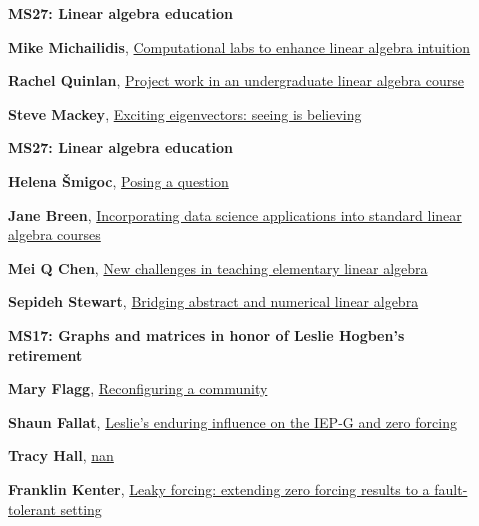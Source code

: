 \documentclass[ILAS2025-program.tex]{subfiles}
\begin{document}
        \begin{description}
    \item[] {\color{mstitle}\textbf{MS27: Linear algebra education}} 
    \item[] \hypertarget{up0292}{}\textbf{Mike Michailidis}, \hyperlink{down0292}{Computational labs to enhance linear algebra intuition}
        \item[] \hypertarget{up0293}{}\textbf{Rachel Quinlan}, \hyperlink{down0293}{Project work in an undergraduate linear algebra course}
        \item[] \hypertarget{up0294}{}\textbf{Steve Mackey}, \hyperlink{down0294}{Exciting eigenvectors: seeing is believing}
        \end{description}
    \begin{description}
    \item[] {\color{mstitle}\textbf{MS27: Linear algebra education}} 
    \item[] \hypertarget{up0331}{}\textbf{Helena Šmigoc}, \hyperlink{down0331}{Posing a question}
        \item[] \hypertarget{up0332}{}\textbf{Jane Breen}, \hyperlink{down0332}{Incorporating data science applications into standard linear algebra courses
}
        \item[] \hypertarget{up0333}{}\textbf{Mei Q Chen}, \hyperlink{down0333}{New challenges in teaching elementary linear algebra}
        \item[] \hypertarget{up0334}{}\textbf{Sepideh Stewart}, \hyperlink{down0334}{Bridging abstract and numerical linear algebra}
        \end{description}
    \begin{description}
    \item[] {\color{mstitle}\textbf{MS17: Graphs and matrices in honor of Leslie Hogben's retirement}} 
    \item[] \hypertarget{up0375}{}\textbf{Mary Flagg}, \hyperlink{down0375}{Reconfiguring a community}
        \item[] \hypertarget{up0376}{}\textbf{Shaun Fallat}, \hyperlink{down0376}{Leslie's enduring influence on the IEP-G and zero forcing}
        \item[] \hypertarget{up0377}{}\textbf{Tracy Hall}, \hyperlink{down0377}{nan}
        \item[] \hypertarget{up0378}{}\textbf{Franklin Kenter}, \hyperlink{down0378}{Leaky forcing: extending zero forcing results to a fault-tolerant setting}
        \end{description}
    \newpage
\end{document}

